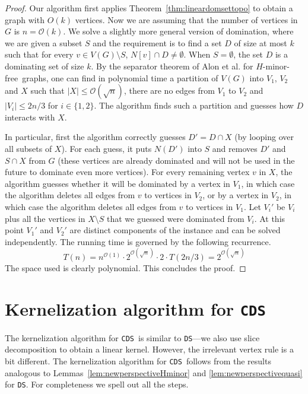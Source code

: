 \documentclass[11pt]{article}
\newcommand{\Hmf}{$H$-minor-free}
\newcommand{\tDS}{{\texttt{\sc DS}}}
\newcommand{\tCDS}{{\texttt{\sc CDS}}}
\newcommand{\cO}{\mathcal{O}}
\begin{document}
\begin{proof} 


Our algorithm first applies Theorem~\ref{thm:lineardomsettopo} to obtain a graph with $O(k)$ vertices.
Now we are assuming that the number of vertices in $G$ is $n=\cO(k)$. 
We solve a slightly more general version of domination, where we are   given a subset $S$ and the requirement is to find a set $D$ of size at most   $k$ such that for every $v\in V(G) \setminus S$, $N[v] \cap D \neq \emptyset$. When $S=\emptyset$, the set $D$ is a dominating set of size $k$.
By the separator theorem of Alon et al.  \cite{AlonST90}
 for \Hmf \, graphs, one can find in polynomial time a partition of $V(G)$ into $V_1$, $V_2$ and $X$ such that $|X| \leq \cO(\sqrt{n})$, there are no edges from $V_1$ to $V_2$ and $|V_i| \leq 2n/3$ for $i \in \{1,2\}$. The algorithm finds such a partition and guesses how $D$ interacts with $X$. 

In particular, first the algorithm correctly guesses $D' = D \cap X$ (by looping over all subsets of $X$). For each guess, it puts $N(D')$ into $S$ and removes $D'$ and $S \cap X$ from $G$ (these vertices are already dominated and will not be used in the future to dominate even more vertices). For every remaining vertex $v$ in $X$, the algorithm guesses whether it will be dominated by a vertex in $V_1$, in which case the algorithm deletes all edges from $v$ to vertices in $V_2$, or by a vertex in $V_2$, in which case the algorithm deletes all edges from $v$ to vertices in $V_1$. Let $V_i'$ be $V_i$ plus all the vertices in $X \setminus S$ that we guessed were dominated from $V_i$. At this point $V_1'$ and $V_2'$ are distinct components of the instance and can be solved independently. The running time is governed by the following recurrence.
$$T(n) =n^{\cO(1)} \cdot  2^{\cO(\sqrt{n})} \cdot 2 \cdot T(2n/3) =  2^{\cO(\sqrt{n})}$$
The space used is clearly polynomial. This concludes the proof.
\end{proof}




\section{Kernelization algorithm for \tCDS}\label{sec:CDSkernel}
The kernelization algorithm for \tCDS \, is   similar to \tDS---we also  use slice decomposition to obtain a 
linear kernel.  However, the irrelevant vertex rule is a bit different. 
The  kernelization algorithm for \tCDS \, follows from the  results 
analogous to  Lemmas~\ref{lem:newperspectiveHminor} and \ref{lem:newperspectivequasi} for \tDS.  For completeness we spell out all the steps. 
\end{document}
